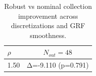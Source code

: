 \begin{table}[h]
\centering
\small
\begin{tabular}{l|c}
\toprule
$\rho$ & $N_{out}=48$ \\ \midrule
1.50 & Δ=-9.110 (p=0.791) \\
\bottomrule
\end{tabular}
\caption{Robust vs nominal collection improvement across discretizations and GRF smoothness.}
\label{tab:collection_sweep}
\end{table}